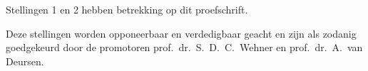 \bigskip \noindent
Stellingen 1 en 2 hebben betrekking op dit proefschrift.

\bigskip \noindent
Deze stellingen worden opponeerbaar en verdedigbaar geacht en zijn als zodanig goedgekeurd door de
promotoren prof.\ dr.\ S.\ D.\ C.\ Wehner en prof.\ dr.\ A.\ van Deursen.
